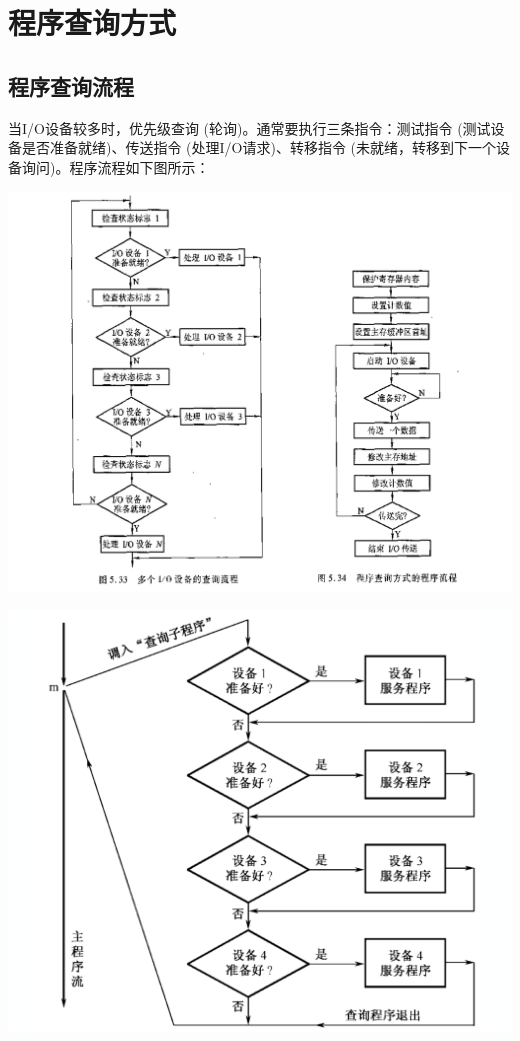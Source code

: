 \documentclass[]{report}
\begin{document}
		\section{程序查询方式}
			\subsection{程序查询流程}
				当I/O设备较多时，优先级查询 (轮询)。通常要执行三条指令：测试指令 (测试设备是否准备就绪)、传送指令 (处理I/O请求)、转移指令 (未就绪，转移到下一个设备询问)。程序流程如下图所示：\par
				\includegraphics[scale = 0.25]{../pictures/program_ask.png}\par
				\includegraphics[scale = 0.23]{../pictures/Program_ask_2.png}\par
\end{document}

